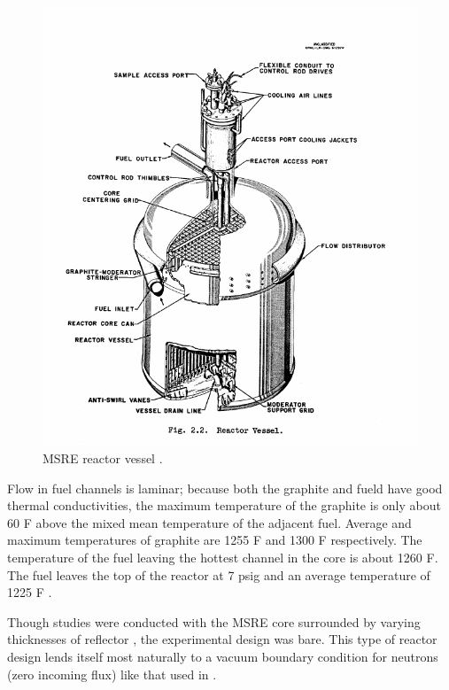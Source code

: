 \documentclass{article}
\begin{document}
\begin{figure}[htpb]
  \centering
  \includegraphics[max height=.5\textheight,max width=\textwidth,keepaspectratio]{MSRE_reactor_vessel.png}
  \caption{\gls{MSRE} reactor vessel \cite{robertson_msre_1965}.}
  \label{fig:MSRE_reactor}
\end{figure}

Flow in fuel channels is laminar; because both the graphite and fueld have good
thermal conductivities, the maximum temperature of the graphite is only about 60
\textdegree F above the mixed mean temperature of the adjacent fuel. Average and
maximum temperatures of graphite are 1255 \textdegree F and 1300 \textdegree F
respectively. The temperature of the fuel leaving the hottest channel in the
core is about 1260 \textdegree F. The fuel leaves the top of the reactor at 7
psig and an average temperature of 1225 \textdegree F \cite{robertson_msre_1965}.

Though studies were conducted with the \gls{MSRE} core surrounded by varying
thicknesses of reflector \cite{haubenreich_msre_1964}, the experimental design
was bare. This type of reactor design lends itself most naturally to a vacuum
boundary condition for neutrons (zero incoming flux) like that used in
\cite{dulla_neutron_2004}.
\end{document}
